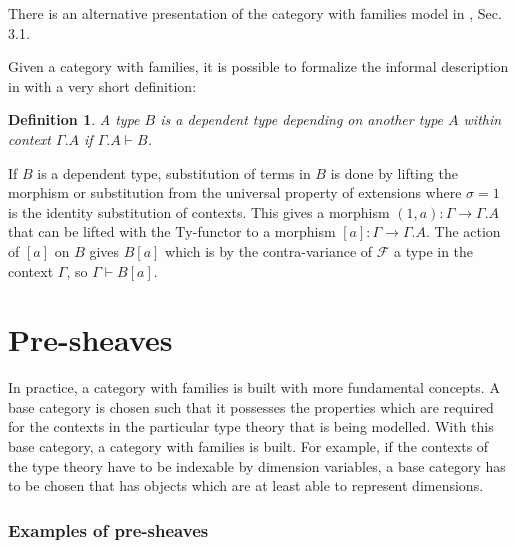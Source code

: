 \documentclass[12pt,a4paper,twoside,xetex]{book} %
\newcommand{\keyword}[1]{\emph{#1}\index{#1}}
\newtheorem{definition}[theorem]{Definition}
\begin{document}
There is an alternative presentation of the category with families model in 
\cite{Orton2019}, Sec. 3.1.

Given a category with families, it is possible to formalize the informal 
description in  with a very short definition:

\begin{definition}\label{depmodel}
A type $B$ is a \keyword{dependent type} depending on another type $A$ within 
context $\Gamma.A$ if $\Gamma.A \vdash B$.
\end{definition}

If $B$ is a dependent type, substitution of terms in $B$ is done by lifting the 
morphism or substitution from the universal property of extensions where 
$\sigma = 1$ is the identity substitution of contexts. This gives a morphism 
$\left(1,a\right):\Gamma\rightarrow\Gamma.A$ that can be lifted with the 
$\text{Ty}$-functor to a morphism 
$\left[a\right]:\Gamma\rightarrow\Gamma.A$. The action of $\left[a\right]$ on 
$B$ gives $B\left[a\right]$ which is by the contra-variance of $\mathcal{F}$ a 
type in the context $\Gamma$, so $\Gamma\vdash B[a]$.

\section{Pre-sheaves}

In practice, a category with families is built with more fundamental concepts. 
A base category is chosen such that it possesses the properties which are required  for the contexts in the particular type theory that is being modelled. With this 
base category, a category with families is built. For example, if the 
contexts of the type theory have to be indexable by dimension variables, a base 
category has to be chosen that has objects which are at least able to represent dimensions.

\subsubsection{Examples of pre-sheaves}\label{pre-sheafexs}
\end{document}
